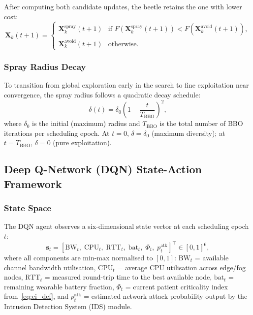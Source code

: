\documentclass[journal,twoside,letterpaper]{IEEEtran}
\newcommand{\vect}[1]{\mathbf{#1}}
\begin{document}
After computing both candidate updates, the beetle retains the one with
lower cost:
\begin{equation}
  \vect{X}_k(t+1) =
  \begin{cases}
    \vect{X}^{\mathrm{spray}}_k(t+1)
      & \text{if } F\!\left(\vect{X}^{\mathrm{spray}}_k(t+1)\right)
                 < F\!\left(\vect{X}^{\mathrm{avoid}}_k(t+1)\right),\\[4pt]
    \vect{X}^{\mathrm{avoid}}_k(t+1) & \text{otherwise.}
  \end{cases}
  \label{eq:bbo_selection}
\end{equation}

\subsubsection{Spray Radius Decay}

To transition from global exploration early in the search to fine
exploitation near convergence, the spray radius follows a quadratic decay
schedule:
\begin{equation}
  \delta(t) = \delta_0 \left(1 - \frac{t}{T_{\mathrm{BBO}}}\right)^{\!2},
  \label{eq:delta_decay}
\end{equation}
where $\delta_0$ is the initial (maximum) radius and $T_{\mathrm{BBO}}$ is
the total number of BBO iterations per scheduling epoch.  At $t = 0$,
$\delta = \delta_0$ (maximum diversity); at $t = T_{\mathrm{BBO}}$,
$\delta = 0$ (pure exploitation).

\subsection{Deep Q-Network (DQN) State-Action Framework}
\label{subsec:dqn}

\subsubsection{State Space}

The DQN agent observes a six-dimensional state vector at each scheduling
epoch $t$:
\begin{equation}
  \vect{s}_t = \left[
    \mathrm{BW}_t,\;
    \mathrm{CPU}_t,\;
    \mathrm{RTT}_t,\;
    \mathrm{bat}_t,\;
    \Phi_t,\;
    p^{\mathrm{atk}}_t
  \right]^\top \in [0,1]^6,
  \label{eq:dqn_state}
\end{equation}
where all components are min-max normalised to $[0,1]$:
$\mathrm{BW}_t$ = available channel bandwidth utilisation,
$\mathrm{CPU}_t$ = average CPU utilisation across edge/fog nodes,
$\mathrm{RTT}_t$ = measured round-trip time to the best available node,
$\mathrm{bat}_t$ = remaining wearable battery fraction,
$\Phi_t$ = current patient criticality index from~\eqref{eq:ci_def}, and
$p^{\mathrm{atk}}_t$ = estimated network attack probability output by
the Intrusion Detection System (IDS) module.
\end{document}
